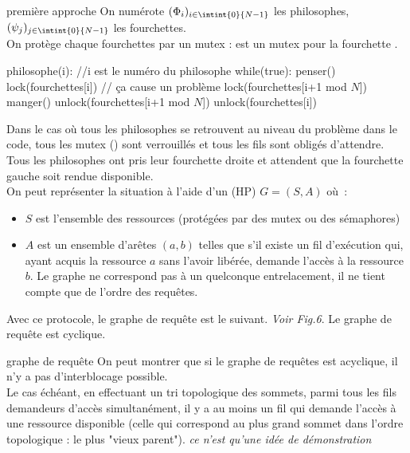 \begin{adjustwidth}{-3cm}{-3cm}
\begin{implementation}{première approche}
    On numérote $(\Phi_i)_{i \in \intint{0}{N-1}}$ les philosophes, $(\psi_j)_{j \in \intint{0}{N-1}}$ les fourchettes.\\
    On protège chaque fourchettes par un mutex :  est un mutex pour la fourchette .
    \begin{lstLNat}
    philosophe(i): //i est le numéro du philosophe
        while(true):
            penser()
            lock(fourchettes[i]) // ça cause un problème
            lock(fourchettes[i+1 mod $N$])
            manger()
            unlock(fourchettes[i+1 mod $N$])
            unlock(fourchettes[i])
    \end{lstLNat}
\end{implementation}
Dans le cas où tous les philosophes se retrouvent au niveau du problème dans le code, tous les mutex () sont verrouillés et tous les fils sont obligés d'attendre.\\
Tous les philosophes ont pris leur fourchette droite et attendent que la fourchette gauche soit rendue disponible.\\
On peut représenter la situation à l'aide d'un  (HP) $G = (S,A)$ où~:
\begin{itemize}
    \item $S$ est l'ensemble des ressources (protégées par des mutex ou des sémaphores)
    \item $A$ est un ensemble d'arêtes $(a,b)$ telles que s'il existe un fil d'exécution qui, ayant acquis la ressource $a$ sans l'avoir libérée, demande l'accès à la ressource $b$.
    Le graphe ne correspond pas à un quelconque entrelacement, il ne tient compte que de l'ordre des requêtes.
\end{itemize}
Avec ce protocole, le graphe de requête est le suivant. \textit{Voir Fig.6}. Le graphe de requête est cyclique.

\begin{remarque}{}{graphe de requête}
    On peut montrer que si le graphe de requêtes est acyclique, il n'y a pas d'interblocage possible.\\
    Le cas échéant, en effectuant un tri topologique des sommets, parmi tous les fils demandeurs d'accès simultanément, il y a au moins un fil qui demande l'accès à une ressource disponible (celle qui correspond au plus grand sommet dans l'ordre topologique : le plus "vieux parent"). \textit{ce n'est qu'une idée de démonstration}
\end{remarque}


\end{adjustwidth}
